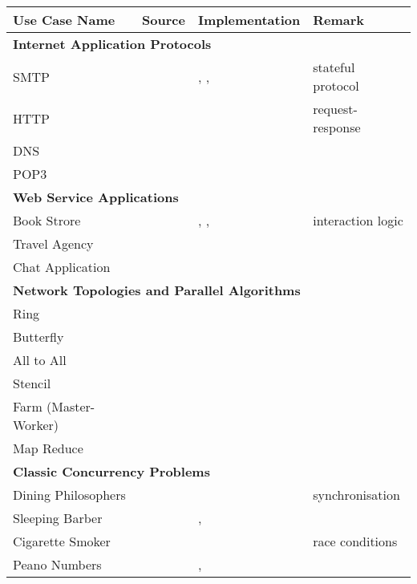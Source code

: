 

\begin{table}
\begin{center}
\begin{tabular}{|l|l|l|l|}
	\hline
	Use Case Name & Source & Implementation & Remark
	\\

	\hline
	\hline
	\multicolumn{4}{|l|}{ \textbf{Internet Application Protocols}}
	\\
	\hline
	SMTP & \cite{SMTP} & \JavaAPI, \TypeState, \Links & stateful protocol
	\\
	HTTP & \cite{HTTP} & \JavaAPI & request-response
	\\
	DNS & \cite{DNS} & \Erlang &
	\\
	POP3 & \cite{POP3} & \TypeState &
	\\

	\hline
	\hline
	\multicolumn{4}{|l|}{ \textbf{Web Service Applications}}
	\\
	\hline
	Book Strore & \cite{BookStore} & \SJ, \Mungo, \JavaAPI  & interaction logic
	\\
	Travel Agency & \cite{TravelAgency} & \SJ &
	\\
	Chat Application & \cite{ChatApplication} & \Erlang &
	\\
	\hline
	\hline
	\multicolumn{4}{|l|}{ \textbf{Network Topologies and Parallel Algorithms}}
	\\
	\hline
	Ring & \cite{BerkleyPar} & \MPI &
	\\
	Butterfly & \cite{BerkleyPar} & \MPI &
	\\
	All to All & \cite{BerkleyPar} & \MPI &
	\\
	Stencil & \cite{BerkleyPar} & \MPI &
	\\
	Farm (Master-Worker) & \cite{BerkleyPar} & \MPI &
	\\
	Map Reduce & \cite{BerkleyPar} & \MPI &
	\\
	\hline
	\hline
	\multicolumn{4}{|l|}{ \textbf{Classic Concurrency Problems}}
	\\
	\hline
	Dining Philosophers & \cite{Savina} & \SPython  & synchronisation
	\\
	Sleeping Barber & \cite{Savina} & \SPython, \SScala &
	\\
	Cigarette Smoker & \cite{Savina} & \SPython & race conditions
	\\
	Peano Numbers & \cite{} & \GV, \Links &
	\\
	\hline
	\hline


\end{tabular}
\end{center}
\end{table}
